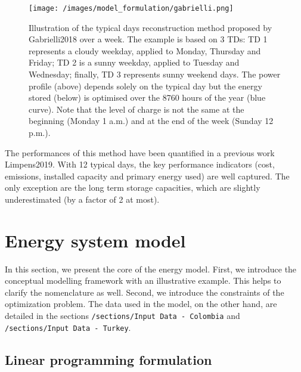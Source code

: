 \documentclass[
]{article}
\begin{document}
\begin{figure}
\centering
\texttt{[image: /images/model\_formulation/gabrielli.png]}
\caption{Illustration of the typical days reconstruction method proposed
by Gabrielli2018 over a week. The example is based on 3 TDs: TD 1
represents a cloudy weekday, applied to Monday, Thursday and Friday; TD
2 is a sunny weekday, applied to Tuesday and Wednesday; finally, TD 3
represents sunny weekend days. The power profile (above) depends solely
on the typical day but the energy stored (below) is optimised over the
8760 hours of the year (blue curve). Note that the level of charge is
not the same at the beginning (Monday 1 a.m.) and at the end of the week
(Sunday 12 p.m.).}
\end{figure}

The performances of this method have been quantified in a previous work
Limpens2019. With 12 typical days, the key performance indicators (cost,
emissions, installed capacity and primary energy used) are well
captured. The only exception are the long term storage capacities, which
are slightly underestimated (by a factor of 2 at most).

\section{Energy system model}\label{sec_estd}

In this section, we present the core of the energy model. First, we
introduce the conceptual modelling framework with an illustrative
example. This helps to clarify the nomenclature as well. Second, we
introduce the constraints of the optimization problem. The data used in
the model, on the other hand, are detailed in the sections
\texttt{/sections/Input\ Data\ -\ Colombia} and
\texttt{/sections/Input\ Data\ -\ Turkey}.

\subsection{Linear programming formulation}\label{ssec_lp_framework}
\end{document}
